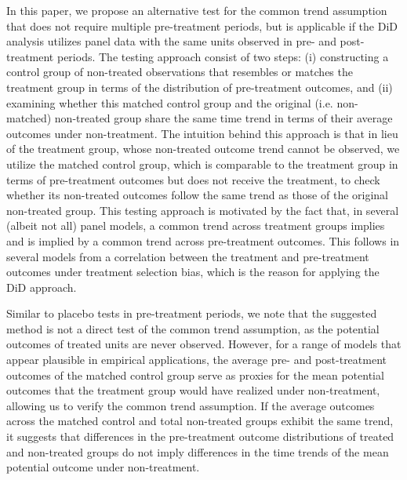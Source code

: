 {	In this paper, we propose an alternative test for the common trend assumption that does not require multiple pre-treatment periods, but is applicable if the DiD analysis utilizes panel data with the same units observed in pre- and post-treatment periods. The testing approach consist of two steps: (i) constructing a control group of non-treated observations that resembles or matches the treatment group in terms of the distribution of pre-treatment outcomes, and (ii) examining whether this matched control group and the original (i.e. non-matched) non-treated group share the same time trend in terms of their average outcomes under non-treatment. The intuition behind this approach is that in lieu of the treatment group, whose non-treated outcome trend cannot be observed, we utilize the matched control group, which is comparable to the treatment group in terms of pre-treatment outcomes but does not receive the treatment, to check whether its non-treated outcomes follow the same trend as those of the original non-treated group. This testing approach is motivated by the fact that, in several (albeit not all) panel models, a common trend across treatment groups implies and is implied by a common trend across pre-treatment outcomes. This follows in several models from a correlation between the treatment and pre-treatment outcomes under treatment selection bias, which is the reason for applying the DiD approach.
	
	Similar to placebo tests in pre-treatment periods, we note that the suggested method is not a direct test of the common trend assumption, as the potential outcomes of treated units are never observed. However, for a range of models that appear plausible in empirical applications, the average pre- and post-treatment outcomes of the matched control group serve as proxies for the mean potential outcomes that the treatment group would have realized under non-treatment, allowing us to verify the common trend assumption. If the average outcomes across the matched control and total non-treated groups exhibit the same trend, it suggests that differences in the pre-treatment outcome distributions of treated and non-treated groups do not imply differences in the time trends of the mean potential outcome under non-treatment. 
	
}
